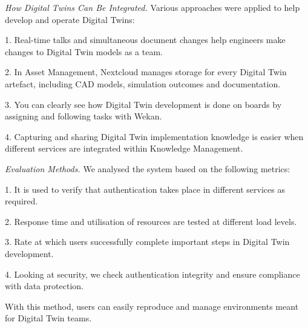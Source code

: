 
\begin{multicols}{2}
\emph{How Digital Twins Can Be Integrated.} Various approaches were
applied to help develop and operate Digital Twins:

1. Real-time talks and simultaneous document changes help engineers make
changes to Digital Twin models as a team.

2. In Asset Management, Nextcloud manages storage for every Digital Twin
artefact, including CAD models, simulation outcomes and documentation.

3. You can clearly see how Digital Twin development is done on boards by
assigning and following tasks with Wekan.

4. Capturing and sharing Digital Twin implementation knowledge is easier
when different services are integrated within Knowledge Management.

\emph{Evaluation Methods.} We analysed the system based on the following
metrics:

1. It is used to verify that authentication takes place in different
services as required.

2. Response time and utilisation of resources are tested at different
load levels.

3. Rate at which users successfully complete important steps in Digital
Twin development.

4. Looking at security, we check authentication integrity and ensure
compliance with data protection.

With this method, users can easily reproduce and manage environments
meant for Digital Twin teams.
\end{multicols}


